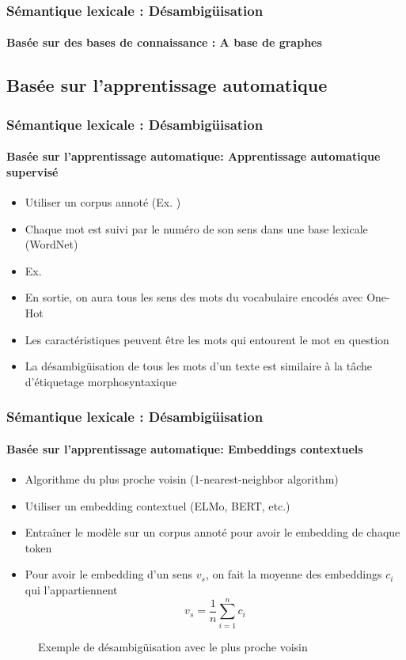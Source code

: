 \documentclass[xcolor=table]{beamer}
\begin{document}
\begin{frame}
\frametitle{Sémantique lexicale : Désambigüisation}
\framesubtitle{Basée sur des bases de connaissance : A base de graphes}
	
	
\end{frame}

\subsection{Basée sur l'apprentissage automatique}

\begin{frame}
\frametitle{Sémantique lexicale : Désambigüisation}
\framesubtitle{Basée sur l'apprentissage automatique: Apprentissage automatique supervisé}
	
\begin{itemize}
	\item Utiliser un corpus annoté (Ex. )
	\item Chaque mot est suivi par le numéro de son sens dans une base lexicale (WordNet)
	\item Ex. 
	\item En sortie, on aura tous les sens des mots du vocabulaire encodés avec One-Hot
	\item Les caractéristiques peuvent être les mots qui entourent le mot en question
	\item La désambigüisation de tous les mots d'un texte est similaire à la tâche d'étiquetage morphosyntaxique
\end{itemize}
	
\end{frame}

\begin{frame}
\frametitle{Sémantique lexicale : Désambigüisation}
\framesubtitle{Basée sur l'apprentissage automatique: Embeddings contextuels}

\begin{minipage}{.68\textwidth}
\begin{itemize}
	\item Algorithme du plus proche voisin (1-nearest-neighbor algorithm) 
	\item Utiliser un embedding contextuel (ELMo, BERT, etc.)
	\item Entraîner le modèle sur un corpus annoté pour avoir le embedding de chaque token
	\item Pour avoir le embedding d'un sens $v_s$, on fait la moyenne des embeddings $c_i$ qui l'appartiennent
	\[ v_s = \frac{1}{n} \sum_{i=1}^{n} c_i \] 
\end{itemize}
\end{minipage}
\begin{minipage}{.3\textwidth}
	\begin{figure}
		\caption{Exemple de désambigüisation avec le plus proche voisin \cite{2019-jurafsky-martin}}
	\end{figure}
\end{minipage}

\end{frame}

\end{document}
